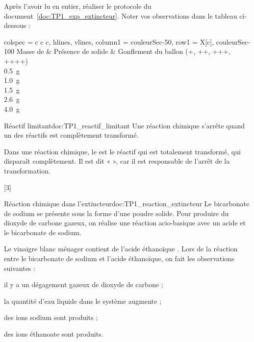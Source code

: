 \mesure Après l'avoir lu en entier, réaliser le protocole du document~\ref{doc:TP1_exp_extincteur}.
Noter vos observations dans le tableau ci-dessous :
\begin{center}
  \begin{tblr}{
    colspec = {c c c}, hlines, vlines,
    column{1} = {couleurSec-50},
    row{1} = {X[c], couleurSec-100}
  }
    Masse de \bicarbonateDeSodium & Présence de \bicarbonateDeSodium solide & Gonflement du ballon (+, ++, +++, ++++) \\
    \qty{0,5}{\g} \\
    \qty{1,0}{\g} \\
    \qty{1,5}{\g} \\
    \qty{2,6}{\g} \\
    \qty{4,0}{\g} \\
  \end{tblr}
\end{center}


\begin{doc}{Réactif limitant}{doc:TP1_reactif_limitant}
  Une réaction chimique s'arrête quand un des réactifs est complètement transformé.
  \begin{importants}
    Dans une réaction chimique, le  est le réactif qui est totalement transformé, qui disparaît complètement.
    Il est dit «  », car il est responsable de l'arrêt de la transformation.
  \end{importants}
\end{doc}

[3]



\begin{doc}{Réaction chimique dans l'extincteur}{doc:TP1_reaction_extincteur}
  Le bicarbonate de sodium  se présente sous la forme d'une poudre solide.
  Pour produire du dioxyde de carbone gazeux, on réalise une réaction acio-basique avec un acide et le bicarbonate de sodium.
  
  Le vinaigre blanc ménager contient de l'acide éthanoïque .
  Lors de la réaction entre le bicarbonate de sodium et l'acide éthanoïque, on fait les observations suivantes :
  \begin{listePoints}
    \item il y a un dégagement gazeux de dioxyde de carbone  ;
    \item la quantité d'eau liquide dans le système augmente ;
    \item des ions sodium  sont produits ;
    \item des ions éthanoate  sont produits.
  \end{listePoints}
\end{doc}

